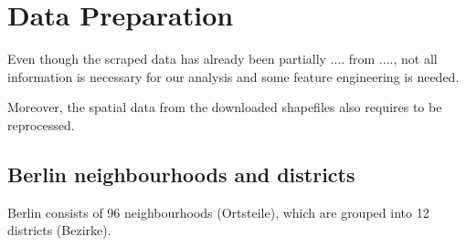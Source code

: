 \section{Data Preparation}\label{Sec:Data Preparation}

Even though the scraped data has already been partially .... from ...., not all information is necessary for our analysis and some feature engineering is needed.

Moreover, the spatial data from the downloaded shapefiles also requires to be reprocessed.

\subsection{Berlin neighbourhoods and districts}


Berlin consists of 96 neighbourhoods (Ortsteile), which are grouped into 12 districts (Bezirke).


